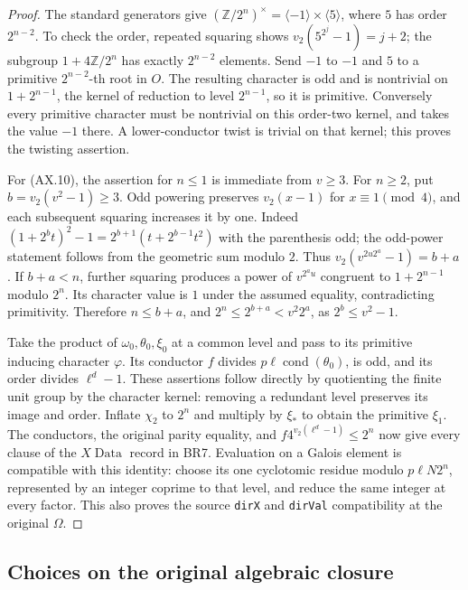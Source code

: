 \begin{proof}
The standard generators give
$(\mathbb Z/2^n)^\times=\langle-1\rangle\times\langle5\rangle$,
where $5$ has order $2^{n-2}$.  To check the order, repeated squaring
shows $v_2(5^{2^j}-1)=j+2$; the subgroup $1+4\mathbb Z/2^n$
has exactly $2^{n-2}$ elements.  Send $-1$ to $-1$ and $5$ to
a primitive $2^{n-2}$-th root in $O$.  The resulting character is
odd and is nontrivial on $1+2^{n-1}$, the kernel of reduction to
level $2^{n-1}$, so it is primitive.  Conversely every primitive
character must be nontrivial on this order-two kernel, and takes
the value $-1$ there.  A lower-conductor twist is trivial on that
kernel; this proves the twisting assertion.

For (AX.10), the assertion for $n\le1$ is immediate from $v\ge3$.
For $n\ge2$, put $b=v_2(v^2-1)\ge3$.  Odd powering preserves
$v_2(x-1)$ for $x\equiv1\pmod4$, and each subsequent squaring
increases it by one.  Indeed
$(1+2^b t)^2-1=2^{b+1}(t+2^{b-1}t^2)$ with the parenthesis odd;
the odd-power statement follows from the geometric sum modulo $2$.
Thus
$v_2(v^{2u2^a}-1)=b+a$.
If $b+a<n$, further squaring produces a power of $v^{2^a u}$
congruent to $1+2^{n-1}$ modulo $2^n$.  Its character value is
$1$ under the assumed equality, contradicting primitivity.
Therefore $n\le b+a$, and
$2^n\le2^{b+a}<v^2 2^a$, as $2^b\le v^2-1$.

Take the product of $\omega_0,\theta_0,\xi_0$ at a common level
and pass to its primitive inducing character $\varphi$.  Its
conductor $f$ divides $p\ell\operatorname{cond}(\theta_0)$,
is odd, and its order divides $\ell^d-1$.  These assertions follow
directly by quotienting the finite unit group by the character
kernel: removing a redundant level preserves its image and order.
Inflate $\chi_2$ to $2^n$ and multiply by $\xi_*$ to obtain the
primitive $\xi_1$.  The conductors, the original parity equality,
and $f4^{v_2(\ell^d-1)}\le2^n$ now give every clause of the
$X\!\operatorname{Data}$ record in BR7.  Evaluation on a Galois
element is compatible with this identity: choose its one
cyclotomic residue modulo $p\ell N2^n$, represented by an integer
coprime to that level, and reduce the same integer at every factor.
This also proves the source \texttt{dirX} and \texttt{dirVal}
compatibility at the original $\Omega$.
\end{proof}

\subsection{Choices on the original algebraic closure}

